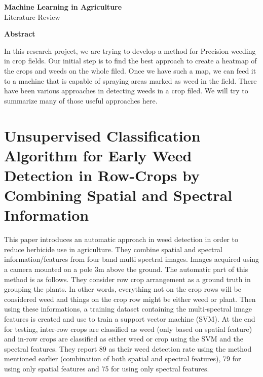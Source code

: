 \documentclass{article}
\begin{document}
  
  
\begin{center}
    {\Large {\bf Machine Learning in Agriculture}} \\
    \vspace{0.3cm}
    {\Large Literature Review} \\
    
    \vspace{1cm}
\end{center}

{\large {\bf Abstract}}

In this research project, we are trying to develop a method for Precision weeding in crop fields. Our initial step is to find the best approach to create a heatmap of the crops and weeds on the whole filed. Once we have such a map, we can feed it to a machine that is capable of spraying areas marked as weed in the field. There have been various approaches in detecting weeds in a crop filed. We will try to summarize many of those useful approaches here. \\

\section{Unsupervised Classification Algorithm for Early
Weed Detection in Row-Crops by Combining
Spatial and Spectral Information ~\cite{louargant-2018-mdpi-unsupervised}}
	
	This paper introduces an automatic approach in weed detection in order to reduce herbicide use in agriculture. They combine spatial and spectral information/features from four band multi spectral images. Images acquired using a camera mounted on a pole 3m above the ground. The automatic part of this method is as follows. They consider row crop arrangement as a ground truth in grouping the plants. In other words, everything not on the crop rows will be considered weed and things on the crop row might be either weed or plant. Then using these informations, a training dataset containing the multi-spectral image features is created and use to train a support vector machine (SVM). At the end for testing, inter-row crops are classified as weed (only based on spatial feature) and in-row crops are classified as either weed or crop using the SVM and the spectral features. They report 89 as their weed detection rate using the method mentioned earlier (combination of both spatial and spectral features), 79 for using only spatial features and 75 for using only spectral features. 
	
\end{document}
